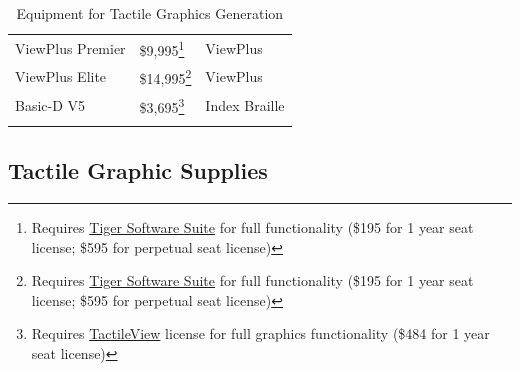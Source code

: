 \documentclass[14pt, letterpaper,twoside]{extreport}
\begin{document}
\begin{longtable}[]{@{}
    >{\raggedright\arraybackslash}p{}
    >{\raggedright\arraybackslash}p{}
    >{\raggedright\arraybackslash}p{}@{}
    }
    ViewPlus Premier                                    & \$9,995\footnote{Requires \href{https://viewplus.com/product/tiger-software-suite8/}{Tiger Software Suite} for full functionality (\$195 for 1 year seat license; \$595 for perpetual seat license)}  & ViewPlus            \\[1.0em]
    ViewPlus Elite                                      & \$14,995\footnote{Requires \href{https://viewplus.com/product/tiger-software-suite8/}{Tiger Software Suite} for full functionality (\$195 for 1 year seat license; \$595 for perpetual seat license)} & ViewPlus            \\[1.0em]
    Basic-D V5                                          & \$3,695\footnote{Requires \href{https://tactileview.com/}{TactileView} license for full graphics functionality (\$484 for 1 year seat license)}                                                       & Index Braille       \\[1.0em]\hline \caption{ Equipment for Tactile Graphics Generation}
\end{longtable}



\hypertarget{tactile-paper}{%
    \subsection*{Tactile Graphic Supplies}\label{tactile-paper}}

\end{document}
